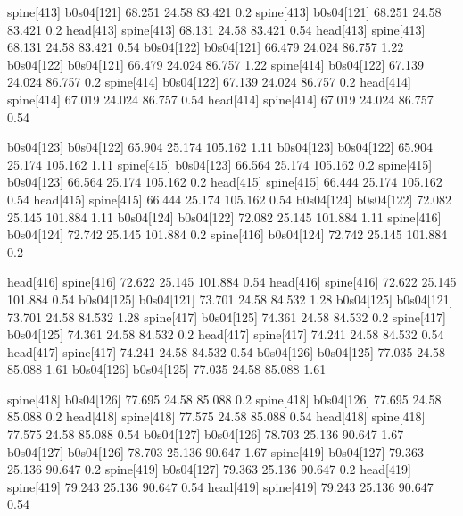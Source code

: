spine[413]    b0s04[121]    68.251    24.58    83.421    0.2
spine[413]    b0s04[121]    68.251    24.58    83.421    0.2
head[413]    spine[413]    68.131    24.58    83.421    0.54
head[413]    spine[413]    68.131    24.58    83.421    0.54
b0s04[122]    b0s04[121]    66.479    24.024    86.757    1.22
b0s04[122]    b0s04[121]    66.479    24.024    86.757    1.22
spine[414]    b0s04[122]    67.139    24.024    86.757    0.2
spine[414]    b0s04[122]    67.139    24.024    86.757    0.2
head[414]    spine[414]    67.019    24.024    86.757    0.54
head[414]    spine[414]    67.019    24.024    86.757    0.54


b0s04[123]    b0s04[122]    65.904    25.174    105.162    1.11
b0s04[123]    b0s04[122]    65.904    25.174    105.162    1.11
spine[415]    b0s04[123]    66.564    25.174    105.162    0.2
spine[415]    b0s04[123]    66.564    25.174    105.162    0.2
head[415]    spine[415]    66.444    25.174    105.162    0.54
head[415]    spine[415]    66.444    25.174    105.162    0.54
b0s04[124]    b0s04[122]    72.082    25.145    101.884    1.11
b0s04[124]    b0s04[122]    72.082    25.145    101.884    1.11
spine[416]    b0s04[124]    72.742    25.145    101.884    0.2
spine[416]    b0s04[124]    72.742    25.145    101.884    0.2


head[416]    spine[416]    72.622    25.145    101.884    0.54
head[416]    spine[416]    72.622    25.145    101.884    0.54
b0s04[125]    b0s04[121]    73.701    24.58    84.532    1.28
b0s04[125]    b0s04[121]    73.701    24.58    84.532    1.28
spine[417]    b0s04[125]    74.361    24.58    84.532    0.2
spine[417]    b0s04[125]    74.361    24.58    84.532    0.2
head[417]    spine[417]    74.241    24.58    84.532    0.54
head[417]    spine[417]    74.241    24.58    84.532    0.54
b0s04[126]    b0s04[125]    77.035    24.58    85.088    1.61
b0s04[126]    b0s04[125]    77.035    24.58    85.088    1.61


spine[418]    b0s04[126]    77.695    24.58    85.088    0.2
spine[418]    b0s04[126]    77.695    24.58    85.088    0.2
head[418]    spine[418]    77.575    24.58    85.088    0.54
head[418]    spine[418]    77.575    24.58    85.088    0.54
b0s04[127]    b0s04[126]    78.703    25.136    90.647    1.67
b0s04[127]    b0s04[126]    78.703    25.136    90.647    1.67
spine[419]    b0s04[127]    79.363    25.136    90.647    0.2
spine[419]    b0s04[127]    79.363    25.136    90.647    0.2
head[419]    spine[419]    79.243    25.136    90.647    0.54
head[419]    spine[419]    79.243    25.136    90.647    0.54


